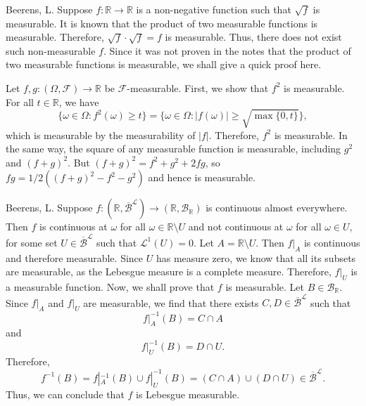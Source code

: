 \begin{solution}[5.19]{Beerens, L.}
    Suppose $f:\mathbb{R}\rightarrow\mathbb{R}$ is a non-negative function such that $\sqrt{f}$ is measurable. It is known that the product of two measurable functions is measurable. Therefore, $\sqrt{f}\cdot\sqrt{f}=f$ is measurable. Thus, there does not exist such non-measurable $f$. Since it was not proven in the notes that the product of two measurable functions is measurable, we shall give a quick proof here. 
    
    Let $f,g:(\Omega,\mathcal{F})\rightarrow \mathbb{R}$ be $\mathcal{F}$-measurable. First, we show that $f^2$ is measurable. For all $t\in\mathbb{R}$, we have
    $$
        \{ \omega\in\Omega:f^2(\omega)\geq t \} = \{ \omega\in\Omega:|f(\omega)|\geq\sqrt{\max\{0,t\}} \},
    $$
    which is measurable by the measurability of $|f|$. Therefore, $f^2$ is measurable. In the same way, the square of any measurable function is measurable, including $g^2$ and $(f+g)^2$. But $(f+g)^2 = f^2 + g^2 +2fg$, so $fg = 1/2 ((f+g)^2 - f^2 - g^2)$ and hence is measurable.
\end{solution}

\begin{solution}[5.20]{Beerens, L.}
    Suppose $f:(\mathbb{R},\overline{\mathcal{B}}^\mathcal{L})\rightarrow(\mathbb{R},\mathcal{B}_\mathbb{R})$ is continuous almost everywhere. Then $f$ is continuous at $\omega$ for all $\omega\in\mathbb{R}\setminus U$ and not continuous at $\omega$ for all $\omega\in U$, for some set $U\in \overline{\mathcal{B}}^\mathcal{L}$ such that $\mathcal{L}^1(U)=0$. Let $A=\mathbb{R}\setminus U$. Then $f|_A$ is continuous and therefore measurable. Since $U$ has measure zero, we know that all its subsets are measurable, as the Lebesgue measure is a complete measure. Therefore, $f|_U$ is a measurable function. Now, we shall prove that $f$ is measurable. Let $B\in\mathcal{B}_\mathbb{R}$. Since $f|_A$ and $f|_U$ are measurable, we find that there exists $C,D\in\overline{\mathcal{B}}^\mathcal{L}$ such that
    $$
        f|_A^{-1}(B) = C\cap A
    $$ 
    and
    $$
        f|_U^{-1}(B) = D\cap U.
    $$
    Therefore,
    $$
        f^{-1}(B) = f|_A^{-1}(B) \cup f|_U^{-1}(B) = (C\cap A) \cup (D\cap U) \in \overline{\mathcal{B}}^\mathcal{L}.
    $$
    Thus, we can conclude that $f$ is Lebesgue measurable.
\end{solution}

